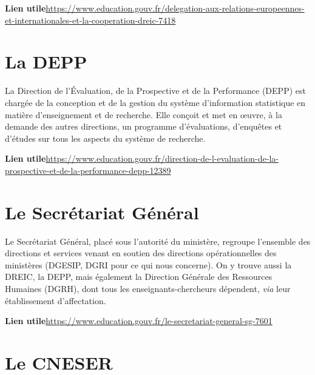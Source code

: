 \textbf{Lien utile\hspace{0.5em}}\url{https://www.education.gouv.fr/delegation-aux-relations-europeennes-et-internationales-et-la-cooperation-dreic-7418}

\section{La DEPP}
La Direction de l'\'Evaluation, de la Prospective et de la Performance (DEPP) est charg\'ee de la conception et de la gestion du syst\`eme d'information statistique en mati\`ere d'enseignement et de recherche. Elle con\c coit et met en \oe uvre, \`a la demande des autres directions, un programme d'\'evaluations, d'enqu\^etes et d'\'etudes sur tous les aspects du syst\`eme de recherche.

\textbf{Lien utile\hspace{0.5em}}\url{https://www.education.gouv.fr/direction-de-l-evaluation-de-la-prospective-et-de-la-performance-depp-12389}

\section{Le Secr\'etariat G\'en\'eral} \label{sgm}

Le Secr\'etariat G\'en\'eral, plac\'e sous l'autorit\'e du minist\`ere, regroupe l'ensemble des directions et services venant en soutien des directions op\'erationnelles des minist\`eres (DGESIP, DGRI pour ce qui nous concerne). On y trouve aussi la DREIC, la DEPP, mais \'egalement la Direction G\'en\'erale des Ressources Humaines (DGRH), dont tous les enseignants-chercheurs d\'ependent, \textit{via} leur \'etablissement d'affectation. 

\textbf{Lien utile\hspace{0.5em}}\url{https://www.education.gouv.fr/le-secretariat-general-sg-7601}

\section{Le CNESER}\label{CNESER}


